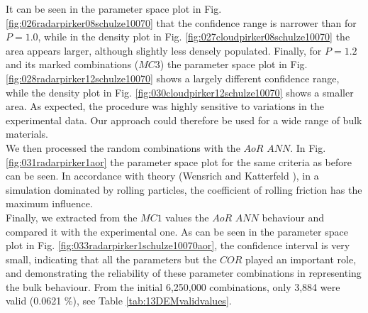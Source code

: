 It can be seen in the parameter space plot in Fig.
\ref{fig:026radarpirker08schulze10070} that the confidence range is narrower
than for $P=1.0$, while in the density plot in Fig. 
\ref{fig:027cloudpirker08schulze10070} the area
appears larger, although slightly less densely populated. Finally, for $P=1.2$
and its marked combinations ($MC3$) the parameter space plot in Fig.
\ref{fig:028radarpirker12schulze10070} shows a largely different confidence
range, while the density plot in Fig. \ref{fig:030cloudpirker12schulze10070} 
shows a smaller area. As expected, the procedure was highly sensitive to
variations in the experimental data.
Our approach could therefore be used
for a wide range of bulk materials.\\
We then processed the random combinations with the $AoR$ $ANN$. In Fig.
\ref{fig:031radarpirker1aor} the parameter space plot for the same criteria as
before can be seen.
In accordance with theory (Wensrich and Katterfeld \cite{RefWorks:87}), in a simulation dominated
by rolling particles, the coefficient of rolling friction has the maximum
influence. \\
Finally, we extracted from the $MC1$ values the $AoR$ $ANN$ behaviour
and compared it with the experimental one.
As can be seen in the parameter space plot in Fig.
\ref{fig:033radarpirker1schulze10070aor}, the confidence interval is very small,
indicating that all the parameters but the $COR$ played an important role, 
and demonstrating the reliability of these parameter
combinations in representing the bulk behaviour.
From the initial 6,250,000 combinations, only 3,884 were valid (0.0621
\%), see Table \ref{tab:13DEMvalidvalues}.








